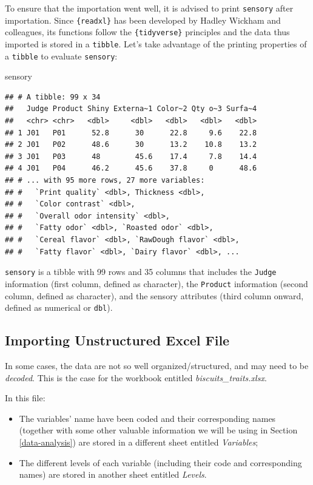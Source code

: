 \documentclass[
]{krantz}
\makeatletter
\newenvironment{Shaded}{\begin{snugshade}}{\end{snugshade}}
\newcommand{\NormalTok}[1]{#1}
\providecommand{\tightlist}{%
  \setlength{\itemsep}{0pt}\setlength{\parskip}{0pt}}
\newenvironment{kframe}{%
\medskip{}
\setlength{\fboxsep}{.8em}
 \def\at@end@of@kframe{}%
 \ifinner\ifhmode%
  \def\at@end@of@kframe{\end{minipage}}%
  \begin{minipage}{\columnwidth}%
 \fi\fi%
 \def\FrameCommand##1{\hskip\@totalleftmargin \hskip-\fboxsep
 \colorbox{shadecolor}{##1}\hskip-\fboxsep
     \hskip-\linewidth \hskip-\@totalleftmargin \hskip\columnwidth}%
 \MakeFramed {\advance\hsize-\width
   \@totalleftmargin\z@ \linewidth\hsize
   \@setminipage}}%
 {\par\unskip\endMakeFramed%
 \at@end@of@kframe}
\renewenvironment{Shaded}{\begin{kframe}}{\end{kframe}}
\makeatother
\begin{document}
To ensure that the importation went well, it is advised to print \texttt{sensory} after importation. Since \texttt{\{readxl\}} has been developed by Hadley Wickham and colleagues, its functions follow the \texttt{\{tidyverse\}} principles and the data thus imported is stored in a \texttt{tibble}. Let's take advantage of the printing properties of a \texttt{tibble} to evaluate \texttt{sensory}:

\begin{Shaded}
\begin{Highlighting}[]
\NormalTok{sensory}
\end{Highlighting}
\end{Shaded}

\begin{verbatim}
## # A tibble: 99 x 34
##   Judge Product Shiny Externa~1 Color~2 Qty o~3 Surfa~4
##   <chr> <chr>   <dbl>     <dbl>   <dbl>   <dbl>   <dbl>
## 1 J01   P01      52.8      30      22.8     9.6    22.8
## 2 J01   P02      48.6      30      13.2    10.8    13.2
## 3 J01   P03      48        45.6    17.4     7.8    14.4
## 4 J01   P04      46.2      45.6    37.8     0      48.6
## # ... with 95 more rows, 27 more variables:
## #   `Print quality` <dbl>, Thickness <dbl>,
## #   `Color contrast` <dbl>,
## #   `Overall odor intensity` <dbl>,
## #   `Fatty odor` <dbl>, `Roasted odor` <dbl>,
## #   `Cereal flavor` <dbl>, `RawDough flavor` <dbl>,
## #   `Fatty flavor` <dbl>, `Dairy flavor` <dbl>, ...
\end{verbatim}

\texttt{sensory} is a tibble with 99 rows and 35 columns that includes the \texttt{Judge} information (first column, defined as character), the \texttt{Product} information (second column, defined as character), and the sensory attributes (third column onward, defined as numerical or \texttt{dbl}).

\hypertarget{importing-unstructured-excel-file}{%
\subsection{Importing Unstructured Excel File}\label{importing-unstructured-excel-file}}

In some cases, the data are not so well organized/structured, and may need to be \emph{decoded}. This is the case for the workbook entitled \emph{biscuits\_traits.xlsx}.

In this file:

\begin{itemize}
\tightlist
\item
  The variables' name have been coded and their corresponding names (together with some other valuable information we will be using in Section \ref{data-analysis}) are stored in a different sheet entitled \emph{Variables};
\item
  The different levels of each variable (including their code and corresponding names) are stored in another sheet entitled \emph{Levels}.
\end{itemize}
\end{document}
